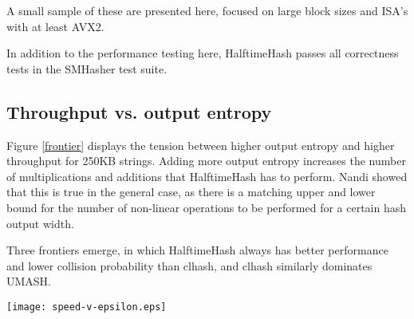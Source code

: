 \documentclass[sigconf, nonacm]{acmart}
\begin{document}
A small sample of these are presented here, focused on large block sizes and ISA's with at least AVX2.

In addition to the performance testing here, HalftimeHash passes all correctness tests in the SMHasher test suite.\cite{smhasher}

\subsection{Throughput vs. output entropy}

Figure \ref{frontier} displays the tension between higher output entropy and higher throughput for 250KB strings.
Adding more output entropy increases the number of multiplications and additions that HalftimeHash has to perform.
Nandi showed that this is true in the general case, as there is a matching upper and lower bound for the number of non-linear operations to be performed for a certain hash output width.

Three frontiers emerge, in which HalftimeHash always has better performance and lower collision probability than clhash, and clhash similarly dominates UMASH.

\texttt{[image: speed-v-epsilon.eps]}



\end{document}
